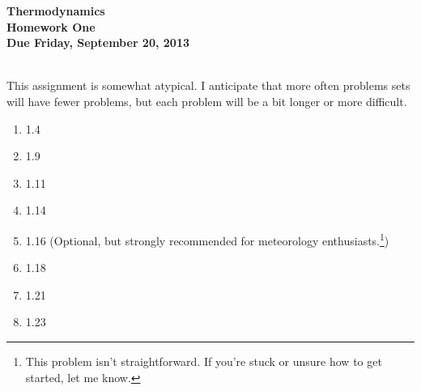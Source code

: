 \documentclass[12pt]{article}
\begin{document}
\pagestyle{empty}
 
\begin{center}
{\large {\bf Thermodynamics}}\\
\medskip
{\large {\bf Homework One}}\\
\medskip
{ {\bf Due Friday, September 20, 2013}}\\
\end{center}

\hspace{2mm}\\

\indent This assignment is somewhat atypical.  I anticipate that more
often problems sets will have fewer problems, but each problem will be
a bit longer or more difficult.  

\begin{enumerate}
\setlength{\itemsep}{-1mm}
  \item 1.4
  \item 1.9 
  \item 1.11
  \item 1.14
  \item 1.16 (Optional, but strongly recommended for meteorology
    enthusiasts.\footnote{This problem isn't straightforward.  If
      you're stuck or unsure how to get started, let me know.}) 
  \item 1.18
  \item 1.21
  \item 1.23

\end{enumerate}
\end{document}

